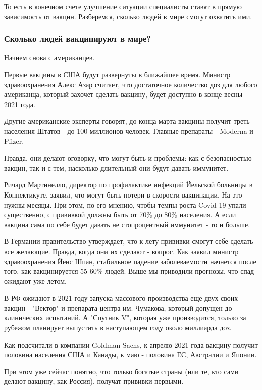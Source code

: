 То есть в конечном счете улучшение ситуации специалисты ставят в прямую
зависимость от вакцин. Разберемся, сколько людей в мире смогут охватить ими. 

\subsubsection{Сколько людей вакцинируют в мире?}

Начнем снова с американцев.

Первые вакцины в США будут развернуты в ближайшее время. Министр
здравоохранения Алекс Азар считает, что достаточное количество доз для любого
американца, который захочет сделать вакцину, будет доступно в конце весны 2021
года.

Другие американские эксперты говорят, до конца марта вакцины получит треть
населения Штатов - до 100 миллионов человек. Главные препараты - Moderna и
Pfizer. 

Правда, они делают оговорку, что могут быть и проблемы: как с безопасностью
вакцин, так и с тем, насколько длительный они будут давать иммунитет. 

Ричард Мартинелло, директор по профилактике инфекций Йельской больницы в
Коннектикуте, заявил, что могут быть потери в скорости вакцинации. На это нужны
месяцы. При этом, по его мнению, чтобы темпы роста Covid-19 упали существенно,
с прививкой должны быть от 70\% до 80\% населения. А если вакцина сама по себе
будет давать не стопроцентный иммунитет - то и больше. 

В Германии правительство утверждает, что к лету прививки смогут себе сделать
все желающие. Правда, когда они их сделают - вопрос. Как заявил министр
здравоохранения Йенс Шпан, стабильное падение заболеваемости начнется после
того, как вакцинируется 55-60\% людей. Выше мы приводили прогнозы, что спад
ожидают уже летом. 

В РФ ожидают в 2021 году запуска массового производства еще двух своих вакцин -
"Вектор" и препарата центра им. Чумакова, который допущен до клинических
испытаний. А "Спутник V", которая уже производится, только за рубежом планирует
выпустить в наступающем году около миллиарда доз. 

Как подсчитали в компании Goldman Sachs, к апрелю 2021 года вакцину получит
половина населения США и Канады, к маю - половина ЕС, Австралии и Японии.

При этом уже сейчас понятно, что только богатые страны (или те, кто сами делают
вакцину, как Россия), получат прививки первыми. 

